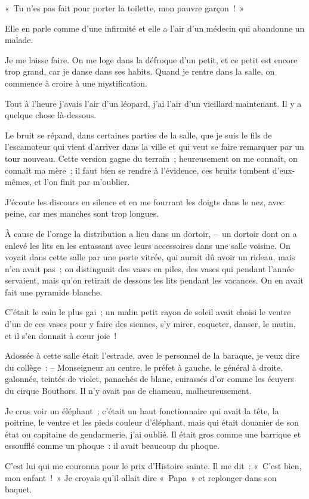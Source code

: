 \documentclass[french,twoside]{book} %
\begin{document}
« Tu n’es pas fait pour porter la toilette, mon pauvre garçon ! »\par
Elle en parle comme d’une infirmité et elle a l’air d’un médecin qui abandonne un malade.\par
Je me laisse faire. On me loge dans la défroque d’un petit, et ce petit est encore trop grand, car je danse dans ses habits. Quand je rentre dans la salle, on commence à croire à une mystification.\par
Tout à l’heure j’avais l’air d’un léopard, j’ai l’air d’un vieillard maintenant. Il y a quelque chose là-dessous.\par
Le bruit se répand, dans certaines parties de la salle, que je suis le fils de l’escamoteur qui vient d’arriver dans la ville et qui veut se faire remarquer par un tour nouveau. Cette version gagne du terrain ; heureusement on me connaît, on connaît ma mère ; il faut bien se rendre à l’évidence, ces bruits tombent d’eux-mêmes, et l’on finit par m’oublier.\par
J’écoute les discours en silence et en me fourrant les doigts dans le nez, avec peine, car mes manches sont trop longues.\par
À cause de l’orage la distribution a lieu dans un dortoir, – un dortoir dont on a enlevé les lits en les entassant avec leurs accessoires dans une salle voisine. On voyait dans cette salle par une porte vitrée, qui aurait dû avoir un rideau, mais n’en avait pas ; on distinguait des vases en piles, des vases qui pendant l’année servaient, mais qu’on retirait de dessous les lits pendant les vacances. On en avait fait une pyramide blanche.\par
C’était le coin le plus gai ; un malin petit rayon de soleil avait choisi le ventre d’un de ces vases pour y faire des siennes, s’y mirer, coqueter, danser, le mutin, et il s’en donnait à cœur joie !\par
Adossée à cette salle était l’estrade, avec le personnel de la baraque, je veux dire du collège : – Monseigneur au centre, le préfet à gauche, le général à droite, galonnés, teintés de violet, panachés de blanc, cuirassés d’or comme les écuyers du cirque Bouthors. Il n’y avait pas de chameau, malheureusement.\par
Je crus voir un éléphant ; c’était un haut fonctionnaire qui avait la tête, la poitrine, le ventre et les pieds couleur d’éléphant, mais qui était douanier de son état ou capitaine de gendarmerie, j’ai oublié. Il était gros comme une barrique et essoufflé comme un phoque : il avait beaucoup du phoque.\par
C’est lui qui me couronna pour le prix d’Histoire sainte. Il me dit : « C’est bien, mon enfant ! » Je croyais qu’il allait dire « Papa » et replonger dans son baquet.
\end{document}

